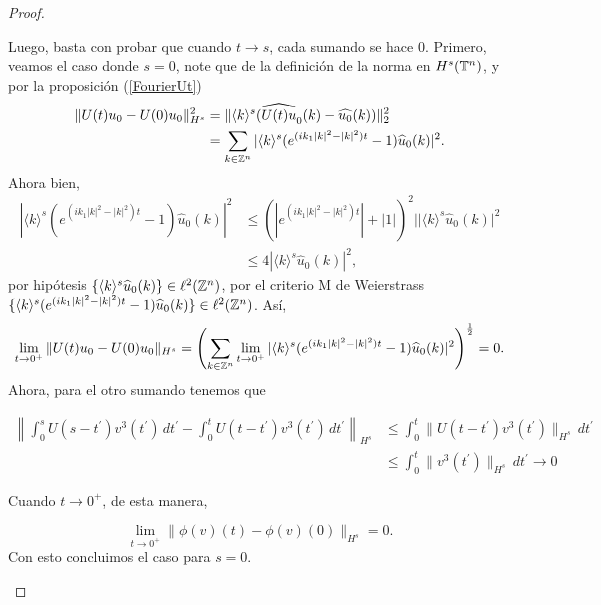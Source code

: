 \begin{proof}
\begin{itemize}
       Luego, basta con probar que cuando $t\to s$, cada sumando se hace 0. Primero, veamos el caso donde $s=0$, note que de la definición de la norma en $H^s(\mathbb{T}^n)$, y por la proposición (\ref{FourierUt}) 
       \begin{align*}
           \|U(t)u_0-U(0)u_0\|_{H^s}^2&=\|\langle k\rangle^s(\widehat{U(t)u}_0(k)-\widehat{u_0}(k))\|_2^2\\
           &=\sum_{k\in\mathbb{Z}^n}|\langle k\rangle^s(e^{(ik_1|k|^2-|k|^2)t}-1)\widehat{u}_0(k)|^2.
       \end{align*}
       Ahora bien,
       \begin{align*}
           |\langle k\rangle^s(e^{(ik_1|k|^2-|k|^2)t}-1)\hat{u}_0(k)|^2&\leq(|e^{(ik_1|k|^2-|k|^2)t}|+|1|)^2||\langle k\rangle^s\hat{u}_0(k)|^2\\
           &\leq 4|\langle k\rangle^s\hat{u}_0(k)|^2,
       \end{align*}
        por hipótesis $\{\langle k\rangle^s\widehat{u}_0(k)\}\in\ell^2(\mathbb{Z}^n)$, por el criterio M de Weierstrass  $\{\langle k\rangle^s(e^{(ik_1|k|^2-|k|^2)t}-1)\widehat{u}_0(k)\}\in\ell^2(\mathbb{Z}^n)$. Así,
       $$\lim_{t\to0^+}\|U(t)u_0-U(0)u_0\|_{H^s}=\left(\sum_{k\in\mathbb{Z}^n}\lim_{t\to0^+}|\langle k\rangle^s(e^{(ik_1|k|^2-|k|^2)t}-1)\widehat{u}_0(k)|^2\right)^{\frac{1}{2}}=0.$$
       Ahora, para el otro sumando tenemos que
       
        \begin{align*}
             \left\|\int_0^sU(s-t^\prime)v^3(t^\prime)\,dt^\prime-\int_0^tU(t-t^\prime)v^3(t^\prime)\,dt^\prime\right\|_{H^s}&\leq\int_0^t\|U(t-t^\prime)v^3(t^\prime)\|_{H^s}\,dt^\prime\\
             &\leq\int_0^t\|v^3(t^\prime)\|_{H^s}\,dt^\prime\to 0
         \end{align*} 

       Cuando $t\to0^+$, de esta manera,

       $$\lim_{t\to0^+}\|\phi(v)(t)-\phi(v)(0)\|_{H^s}=0.$$
       Con esto concluimos el caso para $s=0$.


\end{itemize}
\end{proof}
